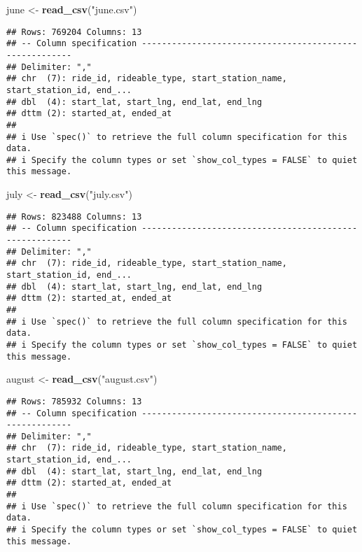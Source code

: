 \documentclass[
]{article}
\newenvironment{Shaded}{\begin{snugshade}}{\end{snugshade}}
\newcommand{\FunctionTok}[1]{\textcolor[rgb]{0.13,0.29,0.53}{\textbf{#1}}}
\newcommand{\NormalTok}[1]{#1}
\newcommand{\OtherTok}[1]{\textcolor[rgb]{0.56,0.35,0.01}{#1}}
\newcommand{\StringTok}[1]{\textcolor[rgb]{0.31,0.60,0.02}{#1}}
\begin{document}
\begin{Shaded}
\begin{Highlighting}[]
\NormalTok{june }\OtherTok{\textless{}{-}} \FunctionTok{read\_csv}\NormalTok{(}\StringTok{"june.csv"}\NormalTok{)}
\end{Highlighting}
\end{Shaded}

\begin{verbatim}
## Rows: 769204 Columns: 13
## -- Column specification --------------------------------------------------------
## Delimiter: ","
## chr  (7): ride_id, rideable_type, start_station_name, start_station_id, end_...
## dbl  (4): start_lat, start_lng, end_lat, end_lng
## dttm (2): started_at, ended_at
## 
## i Use `spec()` to retrieve the full column specification for this data.
## i Specify the column types or set `show_col_types = FALSE` to quiet this message.
\end{verbatim}

\begin{Shaded}
\begin{Highlighting}[]
\NormalTok{july }\OtherTok{\textless{}{-}} \FunctionTok{read\_csv}\NormalTok{(}\StringTok{"july.csv"}\NormalTok{)}
\end{Highlighting}
\end{Shaded}

\begin{verbatim}
## Rows: 823488 Columns: 13
## -- Column specification --------------------------------------------------------
## Delimiter: ","
## chr  (7): ride_id, rideable_type, start_station_name, start_station_id, end_...
## dbl  (4): start_lat, start_lng, end_lat, end_lng
## dttm (2): started_at, ended_at
## 
## i Use `spec()` to retrieve the full column specification for this data.
## i Specify the column types or set `show_col_types = FALSE` to quiet this message.
\end{verbatim}

\begin{Shaded}
\begin{Highlighting}[]
\NormalTok{august }\OtherTok{\textless{}{-}} \FunctionTok{read\_csv}\NormalTok{(}\StringTok{"august.csv"}\NormalTok{)}
\end{Highlighting}
\end{Shaded}

\begin{verbatim}
## Rows: 785932 Columns: 13
## -- Column specification --------------------------------------------------------
## Delimiter: ","
## chr  (7): ride_id, rideable_type, start_station_name, start_station_id, end_...
## dbl  (4): start_lat, start_lng, end_lat, end_lng
## dttm (2): started_at, ended_at
## 
## i Use `spec()` to retrieve the full column specification for this data.
## i Specify the column types or set `show_col_types = FALSE` to quiet this message.
\end{verbatim}
\end{document}
